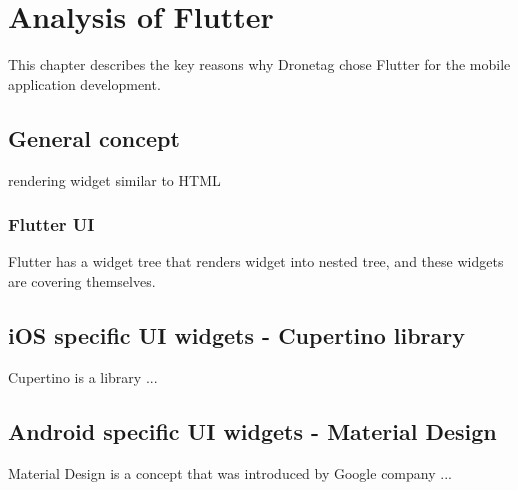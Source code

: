\chapter{Analysis of Flutter}\label{ch:analysis-of-flutter}

This chapter describes the key reasons why Dronetag chose Flutter for the mobile application development.


\section{General concept}\label{sec:general-concept}
rendering widget similar to HTML %

\subsection{Flutter UI}\label{subsec:flutter-ui}
Flutter has a widget tree that renders widget into nested tree, and these widgets are covering themselves. %





\section{iOS specific UI widgets - Cupertino library}\label{sec:ios-specific-ui-widgets}
Cupertino is a library ...


\section{Android specific UI widgets - Material Design}\label{sec:android-specific-ui-widgets}
Material Design is a concept that was introduced by Google company ...
